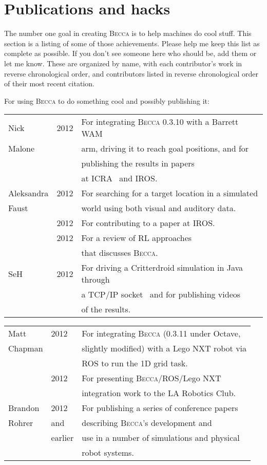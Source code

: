 \chapter{Publications and hacks}

The number one goal in creating \textsc{Becca} is to help machines do cool stuff. This section is a listing of some of those achievements. Please help me keep this list as complete as possible. If you don't see someone here who should be, add them or let me know. These are organized by name, with each contributor's work in reverse chronological order, and contributors listed in reverse chronological order of their most recent citation.

For using \textsc{Becca} to do something cool and possibly publishing it:

\begin{tabular}{|l|l|l|}
\hline
Nick &2012& For integrating \textsc{Becca} 0.3.10 with a Barrett WAM\\
Malone&& arm, driving it to reach goal positions, and for \\
 && publishing the results in papers \\
 && at ICRA~\cite{malone12b} and IROS.~\cite{malone12a}\\
\hline
Aleksandra & 2012 & For searching for a target location in a simulated\\
Faust&& world using both visual and auditory data.\\
&2012& For contributing to a paper at IROS.~\cite{malone12a}\\
&2012& For a review of RL approaches \\
&&that discusses \textsc{Becca}.~\cite{faust12}\\
\hline
SeH & 2012 & For driving a Critterdroid simulation in Java through \\
&&a TCP/IP socket~\cite{seh12a} and for publishing videos \\
&&of the results.~\cite{seh12b,seh12c,seh12d,seh12e} \\
\hline
 \end{tabular}

\begin{tabular}{|l|l|l|}
\hline
Matt & 2012 & For integrating \textsc{Becca} (0.3.11 under Octave,\\
Chapman&& slightly modified) with a Lego NXT robot via \\
&&ROS to run the 1D grid task.~\cite{chapman12a}\\
& 2012 & For presenting \textsc{Becca}/ROS/Lego NXT \\
&&integration work to the LA Robotics Club.~\cite{chapman12b}\\
\hline
Brandon & 2012 & For publishing a series of conference papers  \\
Rohrer & and & describing \textsc{Becca}'s development and \\
& earlier & use in a number of simulations and physical \\
&& robot systems.~\cite{rohrer13a}\\
\hline
\end{tabular}


